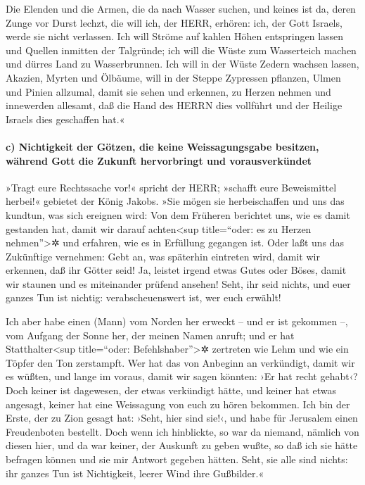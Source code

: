 Die Elenden und die Armen, die da nach Wasser suchen, und
keines ist da, deren Zunge vor Durst lechzt, die will ich, der HERR,
erhören: ich, der Gott Israels, werde sie nicht verlassen.
Ich will Ströme auf kahlen Höhen entspringen lassen und
Quellen inmitten der Talgründe; ich will die Wüste zum Wasserteich
machen und dürres Land zu Wasserbrunnen. Ich will in der
Wüste Zedern wachsen lassen, Akazien, Myrten und Ölbäume, will in der
Steppe Zypressen pflanzen, Ulmen und Pinien allzumal,
damit sie sehen und erkennen, zu Herzen nehmen und
innewerden allesamt, daß die Hand des HERRN dies vollführt und der
Heilige Israels dies geschaffen hat.«

\hypertarget{c-nichtigkeit-der-guxf6tzen-die-keine-weissagungsgabe-besitzen-wuxe4hrend-gott-die-zukunft-hervorbringt-und-vorausverkuxfcndet}{%
\paragraph{c) Nichtigkeit der Götzen, die keine Weissagungsgabe
besitzen, während Gott die Zukunft hervorbringt und
vorausverkündet}\label{c-nichtigkeit-der-guxf6tzen-die-keine-weissagungsgabe-besitzen-wuxe4hrend-gott-die-zukunft-hervorbringt-und-vorausverkuxfcndet}}

»Tragt eure Rechtssache vor!« spricht der HERR; »schafft
eure Beweismittel herbei!« gebietet der König Jakobs.
»Sie mögen sie herbeischaffen und uns das kundtun, was
sich ereignen wird: Von dem Früheren berichtet uns, wie es damit
gestanden hat, damit wir darauf achten\textless sup title=``oder: es zu
Herzen nehmen''\textgreater✲ und erfahren, wie es in Erfüllung gegangen
ist. Oder laßt uns das Zukünftige vernehmen: Gebt an, was
späterhin eintreten wird, damit wir erkennen, daß ihr Götter seid! Ja,
leistet irgend etwas Gutes oder Böses, damit wir staunen und es
miteinander prüfend ansehen! Seht, ihr seid nichts, und
euer ganzes Tun ist nichtig: verabscheuenswert ist, wer euch erwählt!

Ich aber habe einen (Mann) vom Norden her erweckt -- und
er ist gekommen --, vom Aufgang der Sonne her, der meinen Namen anruft;
und er hat Statthalter\textless sup title=``oder:
Befehlshaber''\textgreater✲ zertreten wie Lehm und wie ein Töpfer den
Ton zerstampft. Wer hat das von Anbeginn an verkündigt,
damit wir es wüßten, und lange im voraus, damit wir sagen könnten: ›Er
hat recht gehabt‹? Doch keiner ist dagewesen, der etwas verkündigt
hätte, und keiner hat etwas angesagt, keiner hat eine Weissagung von
euch zu hören bekommen. Ich bin der Erste, der zu Zion
gesagt hat: ›Seht, hier sind sie!‹, und habe für Jerusalem einen
Freudenboten bestellt. Doch wenn ich hinblickte, so war
da niemand, nämlich von diesen hier, und da war keiner, der Auskunft zu
geben wußte, so daß ich sie hätte befragen können und sie mir Antwort
gegeben hätten. Seht, sie alle sind nichts: ihr ganzes
Tun ist Nichtigkeit, leerer Wind ihre Gußbilder.«

